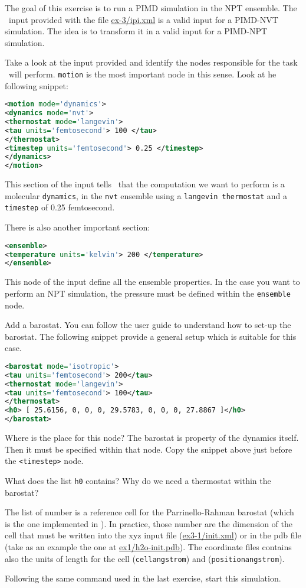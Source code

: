 \documentclass{article}
\begin{document}
\begin{Exercise}[label={inputs},title={PIMD-NPT simulation of ice}]
The goal of this exercise is to run a PIMD simulation in the NPT
ensemble. The \ipi\ input provided with the file \url{ex-3/ipi.xml} is
a valid input for a PIMD-NVT simulation. The idea is to transform it
in a valid input for a PIMD-NPT simulation.

\Question
Take a look at the input provided and identify the nodes responsible
for the task \ipi\ will perform.
\texttt{motion} is the most important node in this sense.
Look at he following snippet:
\begin{lstlisting}[language=xml]
<motion mode='dynamics'>
<dynamics mode='nvt'>
<thermostat mode='langevin'>
<tau units='femtosecond'> 100 </tau>
</thermostat>
<timestep units='femtosecond'> 0.25 </timestep>
</dynamics>
</motion>
\end{lstlisting}
This section of the input tells \ipi\ that the computation we want to
perform is a molecular \texttt{dynamics}, in the \texttt{nvt} ensemble
using a \texttt{langevin thermostat} and a \texttt{timestep} of 0.25
femtosecond. 

There is also another important section:
\begin{lstlisting}[language=xml]
<ensemble>
<temperature units='kelvin'> 200 </temperature>
</ensemble>
\end{lstlisting}
This node of the input define all the ensemble properties. In the
case you want to perform an NPT simulation, the pressure must be
defined within the \texttt{ensemble} node.


\Question
Add a barostat. You can follow the user guide to understand how to
set-up the barostat. The following snippet provide a general setup
which is suitable for this case.
\begin{lstlisting}[language=xml]
<barostat mode='isotropic'>
<tau units='femtosecond'> 200</tau>
<thermostat mode='langevin'>
<tau units='femtosecond'> 100</tau>
</thermostat>
<h0> [ 25.6156, 0, 0, 0, 29.5783, 0, 0, 0, 27.8867 ]</h0>
</barostat>
\end{lstlisting}
Where is the place for this node? The barostat is property of the
dynamics itself. Then it must be specified within that node. Copy the
snippet above just before the \texttt{<timestep>} node.
      
\Question
What does the list \texttt{h0} contains? Why do we need a thermostat
within the barostat? 

The list of number is a reference cell for the Parrinello-Rahman
barostat (which is the one implemented in \ipi). In practice, those
number are the dimension of the cell that must be written into the xyz
input file (\url{ex3-1/init.xml}) or in the pdb file (take as an
example the one at \url{ex1/h2o-init.pdb}). The coordinate files
contains also the units of length for the cell
(\texttt{cell{angstrom}}) and (\texttt{position{angstrom}}).

\Question
Following the same command used in the last exercise, start this
simulation.

\end{Exercise}
\end{document}
